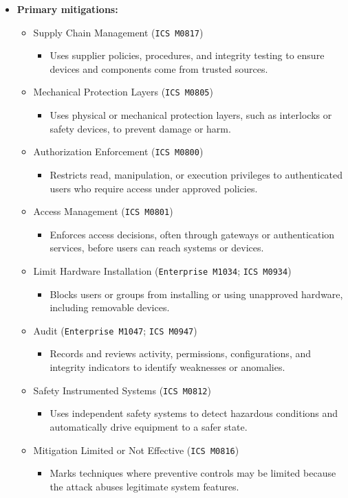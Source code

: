 \documentclass[10pt,a4paper,oneside]{report}
\begin{document}
\begin{itemize}
\item \textbf{Primary mitigations:}
\begin{itemize}
\item Supply Chain Management (\texttt{ICS M0817})
\begin{itemize}
\item Uses supplier policies, procedures, and integrity testing to ensure devices and components come from trusted sources.
\end{itemize}
\item Mechanical Protection Layers (\texttt{ICS M0805})
\begin{itemize}
\item Uses physical or mechanical protection layers, such as interlocks or safety devices, to prevent damage or harm.
\end{itemize}
\item Authorization Enforcement (\texttt{ICS M0800})
\begin{itemize}
\item Restricts read, manipulation, or execution privileges to authenticated users who require access under approved policies.
\end{itemize}
\item Access Management (\texttt{ICS M0801})
\begin{itemize}
\item Enforces access decisions, often through gateways or authentication services, before users can reach systems or devices.
\end{itemize}
\item Limit Hardware Installation (\texttt{Enterprise M1034}; \texttt{ICS M0934})
\begin{itemize}
\item Blocks users or groups from installing or using unapproved hardware, including removable devices.
\end{itemize}
\item Audit (\texttt{Enterprise M1047}; \texttt{ICS M0947})
\begin{itemize}
\item Records and reviews activity, permissions, configurations, and integrity indicators to identify weaknesses or anomalies.
\end{itemize}
\item Safety Instrumented Systems (\texttt{ICS M0812})
\begin{itemize}
\item Uses independent safety systems to detect hazardous conditions and automatically drive equipment to a safer state.
\end{itemize}
\item Mitigation Limited or Not Effective (\texttt{ICS M0816})
\begin{itemize}
\item Marks techniques where preventive controls may be limited because the attack abuses legitimate system features.
\end{itemize}
\end{itemize}
\end{itemize}
\end{document}
